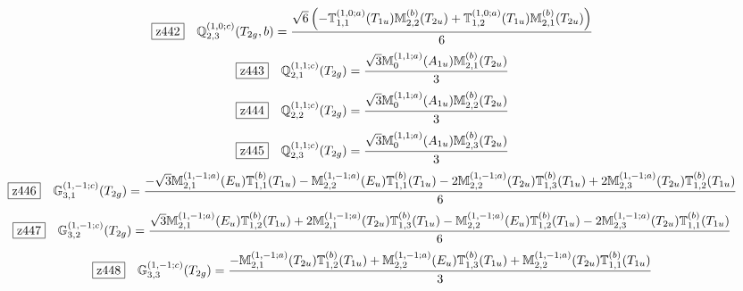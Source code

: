 \documentclass[fleqn,10pt,landscape]{jsarticle}
\begin{document}
\begin{dmath*}
\hspace*{3mm}\fbox{z442}\quad \mathbb{Q}_{2,3}^{(1,0;c)}(T_{2g},b)=\frac{\sqrt{6} \left(- \mathbb{T}_{1,1}^{(1,0;a)}(T_{1u}) \mathbb{M}_{2,2}^{(b)}(T_{2u}) + \mathbb{T}_{1,2}^{(1,0;a)}(T_{1u}) \mathbb{M}_{2,1}^{(b)}(T_{2u})\right)}{6}
\end{dmath*}
\begin{dmath*}
\hspace*{3mm}\fbox{z443}\quad \mathbb{Q}_{2,1}^{(1,1;c)}(T_{2g})=\frac{\sqrt{3} \mathbb{M}_{0}^{(1,1;a)}(A_{1u}) \mathbb{M}_{2,1}^{(b)}(T_{2u})}{3}
\end{dmath*}
\begin{dmath*}
\hspace*{3mm}\fbox{z444}\quad \mathbb{Q}_{2,2}^{(1,1;c)}(T_{2g})=\frac{\sqrt{3} \mathbb{M}_{0}^{(1,1;a)}(A_{1u}) \mathbb{M}_{2,2}^{(b)}(T_{2u})}{3}
\end{dmath*}
\begin{dmath*}
\hspace*{3mm}\fbox{z445}\quad \mathbb{Q}_{2,3}^{(1,1;c)}(T_{2g})=\frac{\sqrt{3} \mathbb{M}_{0}^{(1,1;a)}(A_{1u}) \mathbb{M}_{2,3}^{(b)}(T_{2u})}{3}
\end{dmath*}
\begin{dmath*}
\hspace*{3mm}\fbox{z446}\quad \mathbb{G}_{3,1}^{(1,-1;c)}(T_{2g})=\frac{- \sqrt{3} \mathbb{M}_{2,1}^{(1,-1;a)}(E_{u}) \mathbb{T}_{1,1}^{(b)}(T_{1u}) - \mathbb{M}_{2,2}^{(1,-1;a)}(E_{u}) \mathbb{T}_{1,1}^{(b)}(T_{1u}) - 2 \mathbb{M}_{2,2}^{(1,-1;a)}(T_{2u}) \mathbb{T}_{1,3}^{(b)}(T_{1u}) + 2 \mathbb{M}_{2,3}^{(1,-1;a)}(T_{2u}) \mathbb{T}_{1,2}^{(b)}(T_{1u})}{6}
\end{dmath*}
\begin{dmath*}
\hspace*{3mm}\fbox{z447}\quad \mathbb{G}_{3,2}^{(1,-1;c)}(T_{2g})=\frac{\sqrt{3} \mathbb{M}_{2,1}^{(1,-1;a)}(E_{u}) \mathbb{T}_{1,2}^{(b)}(T_{1u}) + 2 \mathbb{M}_{2,1}^{(1,-1;a)}(T_{2u}) \mathbb{T}_{1,3}^{(b)}(T_{1u}) - \mathbb{M}_{2,2}^{(1,-1;a)}(E_{u}) \mathbb{T}_{1,2}^{(b)}(T_{1u}) - 2 \mathbb{M}_{2,3}^{(1,-1;a)}(T_{2u}) \mathbb{T}_{1,1}^{(b)}(T_{1u})}{6}
\end{dmath*}
\begin{dmath*}
\hspace*{3mm}\fbox{z448}\quad \mathbb{G}_{3,3}^{(1,-1;c)}(T_{2g})=\frac{- \mathbb{M}_{2,1}^{(1,-1;a)}(T_{2u}) \mathbb{T}_{1,2}^{(b)}(T_{1u}) + \mathbb{M}_{2,2}^{(1,-1;a)}(E_{u}) \mathbb{T}_{1,3}^{(b)}(T_{1u}) + \mathbb{M}_{2,2}^{(1,-1;a)}(T_{2u}) \mathbb{T}_{1,1}^{(b)}(T_{1u})}{3}
\end{dmath*}
\end{document}
